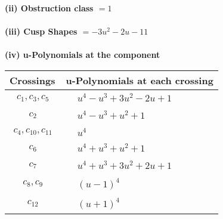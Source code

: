 \documentclass[1p]{elsarticle_modified}
\theoremstyle{definition}
\begin{document}
\flushleft \textbf{(ii) Obstruction class $= 1$}\\~\\
\flushleft \textbf{(iii) Cusp Shapes $= -3 u^2-2 u-11$}\\~\\
\newpage\renewcommand{\arraystretch}{1}
\flushleft \textbf{(iv) u-Polynomials at the component}\newline \\
\begin{tabular}{m{50pt}|m{274pt}}
Crossings & \hspace{64pt}u-Polynomials at each crossing \\
\hline $$\begin{aligned}c_{1},c_{3},c_{5}\end{aligned}$$&$\begin{aligned}
&u^4- u^3+3 u^2-2 u+1
\end{aligned}$\\
\hline $$\begin{aligned}c_{2}\end{aligned}$$&$\begin{aligned}
&u^4- u^3+u^2+1
\end{aligned}$\\
\hline $$\begin{aligned}c_{4},c_{10},c_{11}\end{aligned}$$&$\begin{aligned}
&u^4
\end{aligned}$\\
\hline $$\begin{aligned}c_{6}\end{aligned}$$&$\begin{aligned}
&u^4+u^3+u^2+1
\end{aligned}$\\
\hline $$\begin{aligned}c_{7}\end{aligned}$$&$\begin{aligned}
&u^4+u^3+3 u^2+2 u+1
\end{aligned}$\\
\hline $$\begin{aligned}c_{8},c_{9}\end{aligned}$$&$\begin{aligned}
&(u-1)^4
\end{aligned}$\\
\hline $$\begin{aligned}c_{12}\end{aligned}$$&$\begin{aligned}
&(u+1)^4
\end{aligned}$\\
\hline
\end{tabular}\\~\\
\end{document}
